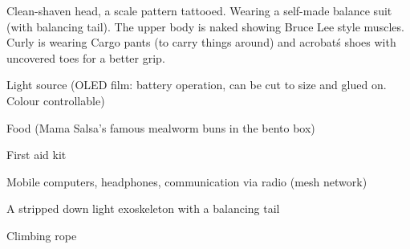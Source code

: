\begin{npcBox}[title=Curly]
    \begin{consequences}
    \item {}
    \item {}
    \item {}
    \end{consequences}

    \begin{npcDescription}
    Clean-shaven head, a scale pattern tattooed. Wearing a self-made balance suit (with balancing tail).
    The upper body is naked showing Bruce Lee style muscles. Curly is wearing Cargo pants (to carry things around) and acrobat\'s shoes with uncovered toes for a better grip.
    \end{npcDescription}


    \begin{equipment}
    \item Light source (OLED film: battery operation, can be cut to size and glued on. Colour controllable)
    \item Food (Mama Salsa's famous mealworm buns in the bento box)
    \item First aid kit
    \item Mobile computers, headphones, communication via radio (mesh network)
    \item A stripped down light exoskeleton with a balancing tail
    \item Climbing rope
    \end{equipment}
\end{npcBox}




